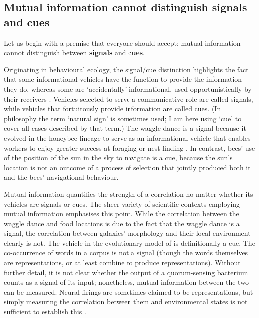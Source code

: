 \documentclass[12pt]{article}
\begin{document}
\subsection{Mutual information cannot distinguish signals and cues}

Let us begin with a premise that everyone should accept: mutual information cannot distinguish between \textbf{signals} and \textbf{cues}.

Originating in behavioural ecology, the signal/cue distinction highlights the fact that some informational vehicles have the function to provide the information they do, whereas some are `accidentally' informational, used opportunistically by their receivers \citep[$\S$1.2]{maynardsmith2003animal}.
Vehicles selected to serve a communicative role are called signals, while vehicles that fortuitously provide information are called cues.
(In philosophy the term `natural sign' is sometimes used; I am here using `cue' to cover all cases described by that term.)
The waggle dance is a signal because it evolved in the honeybee lineage to serve as an informational vehicle that enables workers to enjoy greater success at foraging or nest-finding \citep{gould1975honey,riley2005flight}.
In contrast, bees' use of the position of the sun in the sky to navigate is a cue, because the sun's location is not an outcome of a process of selection that jointly produced both it and the bees' navigational behaviour.

Mutual information quantifies the strength of a correlation no matter whether its vehicles are signals or cues.
The sheer variety of scientific contexts employing mutual information emphasises this point.
While the correlation between the waggle dance and food locations is due to the fact that the waggle dance is a signal, the correlation between galaxies' morphology and their local environment clearly is not.
The vehicle in the evolutionary model of \citet{donaldson-matasci2010fitness} is definitionally a cue.
The co-occurrence of words in a corpus is not a signal (though the words themselves are representations, or at least combine to produce representations).
Without further detail, it is not clear whether the output of a quorum-sensing bacterium counts as a signal of its input; nonetheless, mutual information between the two can be measured.
Neural firings are sometimes claimed to be representations, but simply measuring the correlation between them and environmental states is not sufficient to establish this \citep{rathkopf2017neural}.
\end{document}
